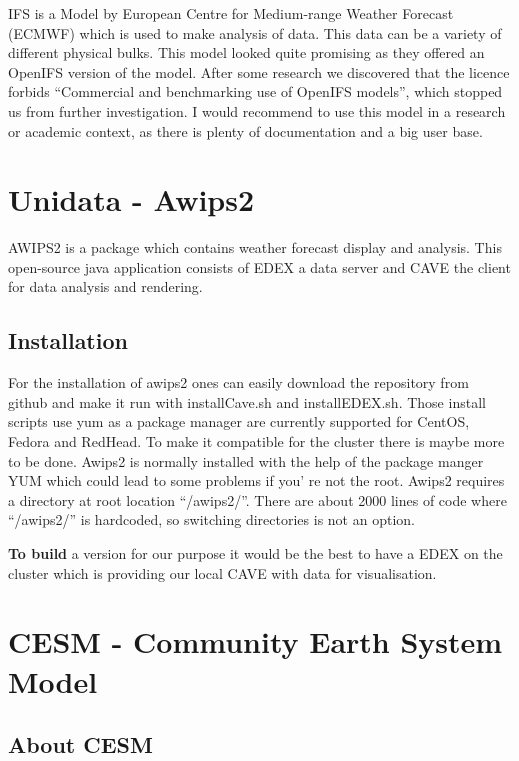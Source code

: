 \documentclass[]{article}
\begin{document}
IFS is a Model by European Centre for Medium-range Weather Forecast
(ECMWF) which is used to make analysis of data. This data can be a
variety of different physical bulks. This model looked quite promising
as they offered an OpenIFS version of the model. After some research we
discovered that the licence forbids ``Commercial and benchmarking use of
OpenIFS models'', which stopped us from further investigation. I would
recommend to use this model in a research or academic context, as there
is plenty of documentation and a big user base.

\section{Unidata - Awips2}\label{unidata---awips2}

AWIPS2 is a package which contains weather forecast display and
analysis. This open-source java application consists of EDEX a data
server and CAVE the client for data analysis and rendering.

\subsection{Installation}\label{installation}

For the installation of awips2 ones can easily download the repository
from github and make it run with installCave.sh and installEDEX.sh.
Those install scripts use yum as a package manager are currently
supported for CentOS, Fedora and RedHead. To make it compatible for the
cluster there is maybe more to be done. Awips2 is normally installed
with the help of the package manger YUM which could lead to some
problems if you' re not the root. Awips2 requires a directory at root
location ``/awips2/''. There are about 2000 lines of code where
``/awips2/'' is hardcoded, so switching directories is not an option.

\textbf{To build} a version for our purpose it would be the best to have
a EDEX on the cluster which is providing our local CAVE with data for
visualisation.

\section{CESM - Community Earth System
Model}\label{cesm---community-earth-system-model}

\subsection{About CESM}\label{about-cesm}
\end{document}
